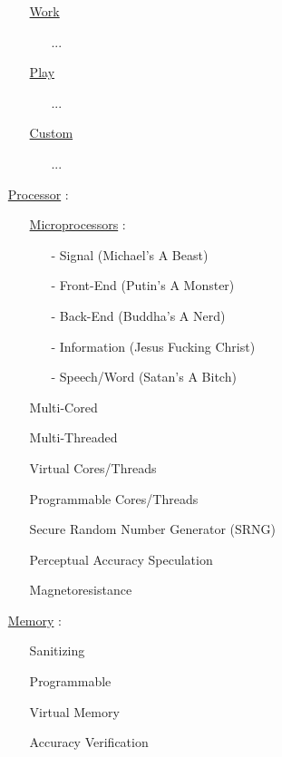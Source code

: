 \documentclass[11pt]{article}
\begin{document}
\begin{enumerate}
\begin{enumerate}
		\item[] \ul{Work}
		\begin{enumerate}
			\item[] ...
		\end{enumerate}
	
		\item[] \ul{Play}
		\begin{enumerate}
			\item[] ...
		\end{enumerate}
	
		\item[] \ul{Custom}
		\begin{enumerate}
			\item[] ...
		\end{enumerate}
	
	\end{enumerate}

	\item[] \ul{Processor} :
	\begin{enumerate}
		\item[] \ul{Microprocessors} :
		\begin{enumerate}
			\item[-] Signal (Michael's A Beast)
			\item[-] Front-End (Putin's A Monster)
			\item[-] Back-End (Buddha's A Nerd)
			\item[-] Information (Jesus Fucking Christ)
			\item[-] Speech/Word (Satan's A Bitch)
		\end{enumerate}
	
		\item[] Multi-Cored
		\item[] Multi-Threaded
		\item[] Virtual Cores/Threads
		\item[] Programmable Cores/Threads
		\item[] Secure Random Number Generator (SRNG)
		\item[] Perceptual Accuracy Speculation
		\item[] Magnetoresistance
		
	\end{enumerate}
	
	\item[] \ul{Memory} :
	\begin{enumerate}
		\item[] Sanitizing
		\item[] Programmable
		\item[] Virtual Memory
		\item[] Accuracy Verification
	

\end{enumerate}
\end{enumerate}
\end{document}
